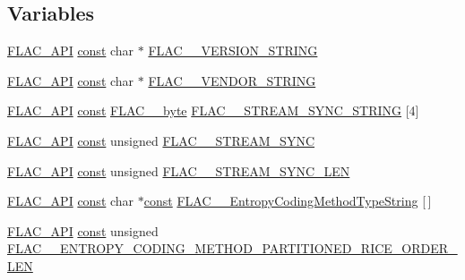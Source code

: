 \subsection*{Variables}
\begin{DoxyCompactItemize}
\item 
\hyperlink{group__flac__export_ga56ca07df8a23310707732b1c0007d6f5}{F\+L\+A\+C\+\_\+\+A\+PI} \hyperlink{zconf_8h_a2c212835823e3c54a8ab6d95c652660e}{const} char $\ast$ \hyperlink{group__flac__format_ga1bd3aa4d4ce0393e51dd55bb3e48fbc1}{F\+L\+A\+C\+\_\+\+\_\+\+V\+E\+R\+S\+I\+O\+N\+\_\+\+S\+T\+R\+I\+NG}
\item 
\hyperlink{group__flac__export_ga56ca07df8a23310707732b1c0007d6f5}{F\+L\+A\+C\+\_\+\+A\+PI} \hyperlink{zconf_8h_a2c212835823e3c54a8ab6d95c652660e}{const} char $\ast$ \hyperlink{group__flac__format_gac05d5441acd3daad33d287165c450a05}{F\+L\+A\+C\+\_\+\+\_\+\+V\+E\+N\+D\+O\+R\+\_\+\+S\+T\+R\+I\+NG}
\item 
\hyperlink{group__flac__export_ga56ca07df8a23310707732b1c0007d6f5}{F\+L\+A\+C\+\_\+\+A\+PI} \hyperlink{zconf_8h_a2c212835823e3c54a8ab6d95c652660e}{const} \hyperlink{ordinals_8h_a5eb569b12d5b047cdacada4d57924ee3}{F\+L\+A\+C\+\_\+\+\_\+byte} \hyperlink{group__flac__format_gab988d92256bae952bd337a55da5e89d0}{F\+L\+A\+C\+\_\+\+\_\+\+S\+T\+R\+E\+A\+M\+\_\+\+S\+Y\+N\+C\+\_\+\+S\+T\+R\+I\+NG} \mbox{[}4\mbox{]}
\item 
\hyperlink{group__flac__export_ga56ca07df8a23310707732b1c0007d6f5}{F\+L\+A\+C\+\_\+\+A\+PI} \hyperlink{zconf_8h_a2c212835823e3c54a8ab6d95c652660e}{const} unsigned \hyperlink{group__flac__format_ga9c002aa5e3dd4f534be5309a6bcfd664}{F\+L\+A\+C\+\_\+\+\_\+\+S\+T\+R\+E\+A\+M\+\_\+\+S\+Y\+NC}
\item 
\hyperlink{group__flac__export_ga56ca07df8a23310707732b1c0007d6f5}{F\+L\+A\+C\+\_\+\+A\+PI} \hyperlink{zconf_8h_a2c212835823e3c54a8ab6d95c652660e}{const} unsigned \hyperlink{group__flac__format_ga71d8c89809a47f79c8650a2e331436f0}{F\+L\+A\+C\+\_\+\+\_\+\+S\+T\+R\+E\+A\+M\+\_\+\+S\+Y\+N\+C\+\_\+\+L\+EN}
\item 
\hyperlink{group__flac__export_ga56ca07df8a23310707732b1c0007d6f5}{F\+L\+A\+C\+\_\+\+A\+PI} \hyperlink{zconf_8h_a2c212835823e3c54a8ab6d95c652660e}{const} char $\ast$\hyperlink{zconf_8h_a2c212835823e3c54a8ab6d95c652660e}{const} \hyperlink{group__flac__format_gaf4f3faf80000ebe7cc357af9bbbaa3b4}{F\+L\+A\+C\+\_\+\+\_\+\+Entropy\+Coding\+Method\+Type\+String} \mbox{[}$\,$\mbox{]}
\item 
\hyperlink{group__flac__export_ga56ca07df8a23310707732b1c0007d6f5}{F\+L\+A\+C\+\_\+\+A\+PI} \hyperlink{zconf_8h_a2c212835823e3c54a8ab6d95c652660e}{const} unsigned \hyperlink{group__flac__format_ga9839a3378f519e065a3599585e4a9588}{F\+L\+A\+C\+\_\+\+\_\+\+E\+N\+T\+R\+O\+P\+Y\+\_\+\+C\+O\+D\+I\+N\+G\+\_\+\+M\+E\+T\+H\+O\+D\+\_\+\+P\+A\+R\+T\+I\+T\+I\+O\+N\+E\+D\+\_\+\+R\+I\+C\+E\+\_\+\+O\+R\+D\+E\+R\+\_\+\+L\+EN}

\end{DoxyCompactItemize}
